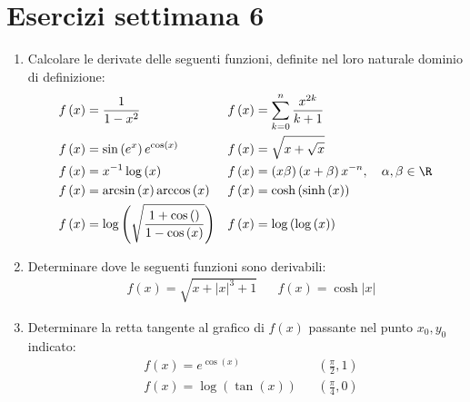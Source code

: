\section{Esercizi settimana 6}
\begin{enumerate}
	\item Calcolare le derivate delle seguenti funzioni, definite nel loro naturale dominio di definizione:
	      \begin{align*}
		       & f\left(x\right) = \frac{1}{1 - x^2 }                                                              &  & f\left(x\right) = \sum_{k=0}^{n} \frac{x^{2k }}{k +1}                                                \\
		       & f\left(x\right) = \sin \left(e^{x}\right)e^{\cos \left(x\right)}                                  &  & f\left(x\right) = \sqrt{x+ \sqrt{x}}                                                                 \\
		       & f\left(x\right) = x ^{-1}\log  \left(x\right)                                                     &  & f\left(x\right) = \left(x  \beta \right)\left(x + \beta \right)x^{-n}, \quad  \alpha ,\beta  \in  \R \\
		       & f\left(x\right) = \arcsin \left(x\right) \arccos \left(x\right)                                   &  & f\left(x\right) = \cosh \left(\sinh \left(x\right)\right)                                            \\
		       & f\left(x\right) = \log \left(\sqrt{\frac{1 + \cos \left(\right)}{1 - \cos \left(x\right)}}\right) &  & f\left(x\right) = \log \left(\log \left(x\right)\right)                                              \\
	      \end{align*}
	\item Determinare dove le seguenti funzioni sono derivabili:
	      \begin{align*}
		       & f\left(x\right) = \sqrt{ x + \left|x\right|^3  + 1} &  & f\left(x\right) = \cosh \left|x\right|
	      \end{align*}
	\item Determinare la retta tangente al grafico di $ f\left(x\right) $ passante nel punto $ x_0, y_0 $ indicato:
	      \begin{align*}
		       & f\left(x\right) = e^{\cos \left(x\right)}               &  & \left(\frac{\pi}{2}, 1\right)                                                                               \\
		       & f\left(x\right) = \log \left(\tan \left(x\right)\right) &  & \left(\frac{\pi}{4}, 0\right)                                                                               \\

\end{align*}
\end{enumerate}
